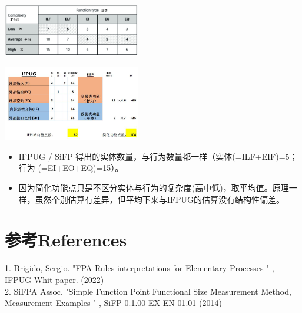 
\includegraphics[width=6cm]{微信截图_20230703095053-2.jpg}


\includegraphics[width=6cm]{FPA_S11.jpg}

\begin{itemize}
\tightlist
\item
  IFPUG / SiFP 得出的实体数量，与行为数量都一样（实体(=ILF+EIF)=5；行为
  (=EI+EO+EQ)=15）。
\item
  因为简化功能点只是不区分实体与行为的复杂度(高中低)，取平均值。原理一样，虽然个别估算有差异，但平均下来与IFPUG的估算没有结构性偏差。
\end{itemize}

\hypertarget{ux53c2ux8003references}{%
\section{参考References}\label{ux53c2ux8003references}}

1. Brigido, Sergio. "FPA Rules interpretations for Elementary Processes " , IFPUG Whit paper. (2022)\\
2. SiFPA Assoc. "Simple Function Point Functional Size Measurement Method, Measurement Examples " , SiFP-0.1.00-EX-EN-01.01 (2014)\\


